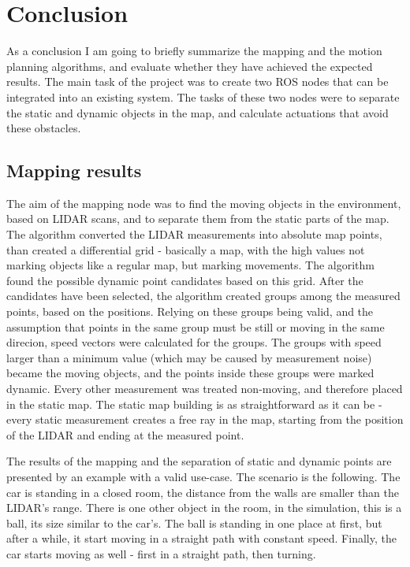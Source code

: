 \chapter{Conclusion}
\label{chap:conclusion}

As a conclusion I am going to briefly summarize the mapping and the motion planning algorithms, and evaluate whether they have achieved the expected results. The main task of the project was to create two ROS nodes that can be integrated into an existing system. The tasks of these two nodes were to separate the static and dynamic objects in the map, and calculate actuations that avoid these obstacles.

\section{Mapping results}
The aim of the mapping node was to find the moving objects in the environment, based on LIDAR scans, and to separate them from the static parts of the map. The algorithm converted the LIDAR measurements into absolute map points, than created a differential grid - basically a map, with the high values not marking objects like a regular map, but marking movements. The algorithm found the possible dynamic point candidates based on this grid. After the candidates have been selected, the algorithm created groups among the measured points, based on the positions. Relying on these groups being valid, and the assumption that points in the same group must be still or moving in the same direcion, speed vectors were calculated for the groups. The groups with speed larger than a minimum value (which may be caused by measurement noise) became the moving objects, and the points inside these groups were marked dynamic. Every other measurement was treated non-moving, and therefore placed in the static map. The static map building is as straightforward as it can be - every static measurement creates a free ray in the map, starting from the position of the LIDAR and ending at the measured point.

The results of the mapping and the separation of static and dynamic points are presented by an example with a valid use-case. The scenario is the following. The car is standing in a closed room, the distance from the walls are smaller than the LIDAR's range. There is one other object in the room, in the simulation, this is a ball, its size similar to the car's. The ball is standing in one place at first, but after a while, it start moving in a straight path with constant speed. Finally, the car starts moving as well - first in a straight path, then turning.

